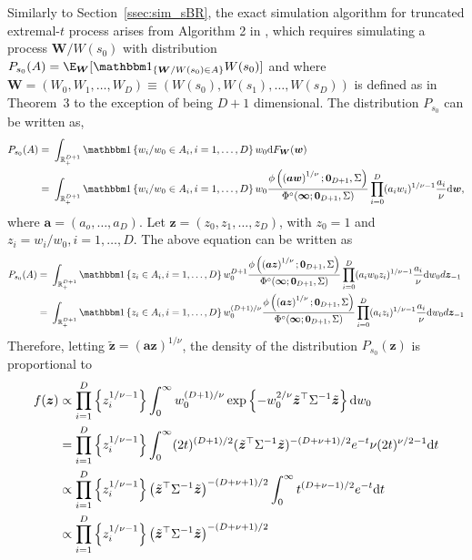 \documentclass[12pt]{article}
\begin{document}
Similarly to Section~\ref{ssec:sim_sBR}, the exact simulation algorithm for truncated extremal-$t$ process arises from Algorithm 2 in \cite{Dombry.Engelke.Oesting:2016}, which requires simulating a process $\bm W/W(s_0)$ with distribution $P_{s_0}(A) = \E_{\bm W}[\mathbbm 1_{\{\bm W/W(s_0)\in A\}}W(s_0)]$ and where $\bm W = (W_0, W_1, \ldots, W_D) \equiv \left( W(s_0), W(s_1), \ldots, W(s_D)\right)$ is defined as in Theorem~3 to the exception of being $D+1$ dimensional. The distribution $P_{s_0}$ can be written as,
\begin{align*}
	P_{s_0}(A) =&\ \int_{\mathbb{R}_+^{D+1}} \mathbbm 1 \left\{w_i/w_0 \in A_i, i=1,\dots,D  \right\} w_0 \text dF_{\bm W}(\bm w)  \\
	=&\ \int_{\mathbb{R}_+^{D+1}} \mathbbm 1 \left\{ w_i/w_0 \in A_i, i=1,\dots,D \right\} w_0 \frac{\phi\left(\left( \bm a \bm w\right)^{1/\nu};\bm 0_{D+1},\Sigma\right)}{\Phi^\circ(\bm \infty; \bm 0_{D+1}, \Sigma)} \prod_{i=0}^D(a_i w_i)^{1/\nu-1} \frac{a_i}{\nu} \text d \bm w,
\end{align*}  	
where $\bm a = (a_o, \ldots, a_D)$.
Let $\bm z = (z_0, z_1, \ldots, z_D)$, with $z_0 = 1$ and $z_i = w_i/w_0, i=1, \ldots, D$. The above equation can be written as
%
\begin{align*}
P_{s_0}(A) =&\ \int_{\mathbb{R}_+^{D+1}} \mathbbm 1 \left\{z_i \in A_i, i=1,\dots,D\right\} w_0^{D+1} 
\frac{\phi\left(\left( \bm a \bm z\right)^{1/\nu};\bm 0_{D+1},\Sigma\right)}{\Phi^\circ(\bm \infty; \bm 0_{D+1}, \Sigma)} \prod_{i=0}^D(a_i w_0 z_i)^{1/\nu-1} \frac{a_i}{\nu} \text dw_0 d \bm z_{-1}\\
=&\ \int_{\mathbb{R}_+^{D+1}} \mathbbm 1 \left\{ z_i \in A_i, i=1,\dots,D\right\} w_0^{(D+1)/\nu} \frac{\phi\left(\left( \bm a \bm z\right)^{1/\nu};\bm 0_{D+1},\Sigma\right)}{\Phi^\circ(\bm \infty; \bm 0_{D+1}, \Sigma)} \prod_{i=0}^D(a_i z_i)^{1/\nu-1} \frac{a_i}{\nu} \text dw_0 d \bm z_{-1}\\
\end{align*}
%
Therefore, letting $\tilde{\bm z} = ( \bm a \bm z)^{1/\nu}$, the density of the distribution $P_{s_0}(\bm z)$ is proportional to 
\begin{align*}
f(\bm z) & \propto \prod_{i=1}^D \left\{ z_i^{1/\nu-1}\right\}
 \int_{0}^{\infty} w_0^{(D+1)/\nu} \exp\left\{- w_0^{2/\nu} \tilde{\bm z}^\top \Sigma^{-1} \tilde{\bm z} \right\} \text dw_0 \\
	&= \prod_{i=1}^D \left\{ z_i^{1/\nu-1} \right\}
 \int_{0}^{\infty} (2t)^{(D+1)/2} (\tilde{\bm z}^\top \Sigma^{-1} \tilde{\bm z})^{-(D+\nu+1)/2} e^{-t} \nu (2t)^{\nu/2-1} \text dt \\
	& \propto  \prod_{i=1}^D \left\{ z_i^{1/\nu-1}\right\}  \left(\tilde{\bm z}^\top \Sigma^{-1} \tilde{\bm z}\right)^{-(D+\nu+1)/2} \int_{0}^{\infty} t^{(D+\nu-1)/2} e^{-t} \text dt \\
	&\propto \prod_{i=1}^D \left\{z_i^{1/\nu-1}\right\} \left(\tilde{\bm z}^\top \Sigma^{-1}\tilde{\bm z}\right)^{-(D+\nu+1)/2}
\end{align*}
\end{document}
